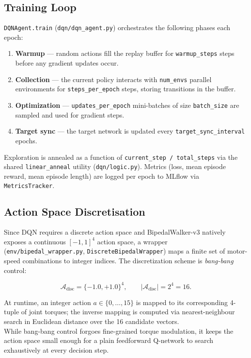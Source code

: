 \subsection{Training Loop}
\texttt{DQNAgent.train} (\texttt{dqn/dqn\_agent.py}) orchestrates the following phases each epoch:
\begin{enumerate}
    \item \textbf{Warmup} — random actions fill the replay buffer for \texttt{warmup\_steps} steps before any gradient updates occur.
    \item \textbf{Collection} — the current policy interacts with \texttt{num\_envs} parallel environments for \newline \texttt{steps\_per\_epoch} steps, storing transitions in the buffer.
    \item \textbf{Optimization} — \texttt{updates\_per\_epoch} mini-batches of size \texttt{batch\_size} are sampled and used for gradient steps.
    \item \textbf{Target sync} — the target network is updated every \texttt{target\_sync\_interval} epochs.
\end{enumerate}

Exploration is annealed as a function of \texttt{current\_step / total\_steps} via the shared \texttt{linear\_anneal} utility (\texttt{dqn/logic.py}). Metrics (loss, mean episode reward, mean episode length) are logged per epoch to MLflow via \texttt{MetricsTracker}.

\subsection{Action Space Discretisation}

Since DQN requires a discrete action space and BipedalWalker-v3 natively exposes a continuous $[-1,1]^4$ action space, a wrapper (\texttt{env/bipedal\_wrapper.py}, \texttt{DiscreteBipedalWrapper}) maps a finite set of motor-speed combinations to integer indices. The discretization scheme is \emph{bang-bang} control:

\begin{equation}
    \mathcal{A}_{\text{disc}} = \{-1.0, +1.0\}^4, \qquad |\mathcal{A}_{\text{disc}}| = 2^4 = 16.
\end{equation}

At runtime, an integer action $a \in \{0, \dots, 15\}$ is mapped to its corresponding 4-tuple of joint torques; the inverse mapping is computed via nearest-neighbour search in Euclidean distance over the 16 candidate vectors. 
\\
While bang-bang control forgoes fine-grained torque modulation, it keeps the action space small enough for a plain feedforward Q-network to search exhaustively at every decision step.

